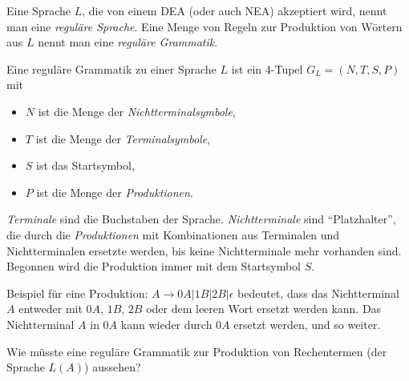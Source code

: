 \documentclass[fontsize=10pt, a4paper, ngerman]{scrartcl}
\begin{document}
Eine Sprache $L$, die von einem DEA (oder auch NEA) akzeptiert wird, nennt man eine
\emph{reguläre Sprache}. Eine Menge von Regeln zur Produktion von Wörtern aus
$L$ nennt man eine \emph{reguläre Grammatik}.

\begin{infobox}
Eine reguläre Grammatik zu einer Sprache $L$ ist ein 4-Tupel $G_L = (N, T, S, P)$ mit
\begin{itemize}
	\item $N$ ist die Menge der \emph{Nichtterminalsymbole},
	\item $T$ ist die Menge der \emph{Terminalsymbole},
	\item $S$ ist das Startsymbol,
	\item $P$ ist die Menge der \emph{Produktionen}.
\end{itemize}
\end{infobox}

\emph{Terminale} sind die Buchstaben der Sprache. \emph{Nichtterminale} sind
\enquote{Platzhalter}, die durch die \emph{Produktionen} mit Kombinationen aus
Terminalen und Nichtterminalen ersetzte werden, bis keine Nichtterminale mehr vorhanden
sind. Begonnen wird die Produktion immer mit dem Startsymbol $S$.

{\small Beispiel für eine Produktion: $A \rightarrow 0A | 1B | 2B | \epsilon$ bedeutet,
dass das Nichtterminal $A$ entweder mit $0A$, $1B$, $2B$ oder dem leeren Wort ersetzt werden
kann. Das Nichtterminal $A$ in $0A$ kann wieder durch $0A$ ersetzt werden, und so weiter.}

\begin{aufgabe}
Wie müsste eine reguläre Grammatik zur Produktion von Rechentermen (der Sprache $L(A)$)
aussehen?
\end{aufgabe}
\end{document}
